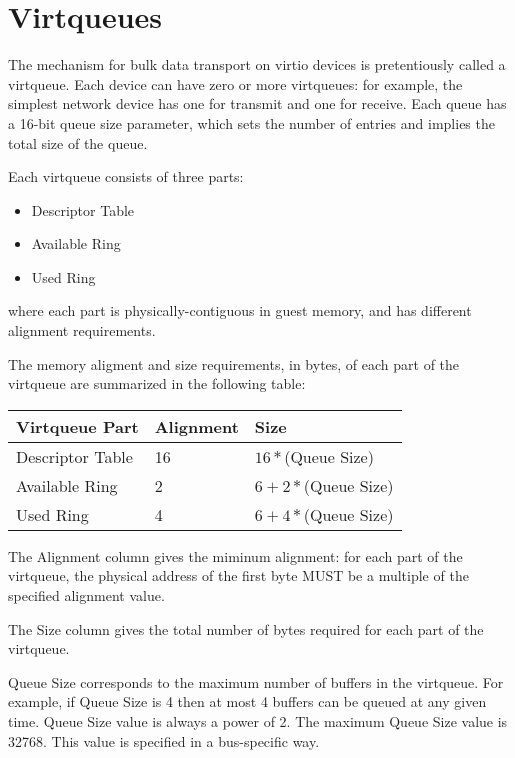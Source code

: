 \section{Virtqueues}\label{sec:Basic Facilities of a Virtio Device / Virtqueues}

The mechanism for bulk data transport on virtio devices is
pretentiously called a virtqueue. Each device can have zero or more
virtqueues: for example, the simplest network device has one for
transmit and one for receive.  Each queue has a 16-bit queue size
parameter, which sets the number of entries and implies the total size
of the queue.

Each virtqueue consists of three parts:

\begin{itemize}
\item Descriptor Table
\item Available Ring
\item Used Ring
\end{itemize}

where each part is physically-contiguous in guest memory,
and has different alignment requirements.

The memory aligment and size requirements, in bytes, of each part of the
virtqueue are summarized in the following table:

\begin{tabular}{|l|l|l|}
\hline
Virtqueue Part    & Alignment & Size \\
\hline \hline
Descriptor Table  & 16        & $16 * $(Queue Size) \\
\hline
Available Ring    & 2         & $6 + 2 * $(Queue Size) \\
 \hline
Used Ring         & 4         & $6 + 4 * $(Queue Size) \\
 \hline
\end{tabular}

The Alignment column gives the miminum alignment: for each part
of the virtqueue, the physical address of the first byte
MUST be a multiple of the specified alignment value.

The Size column gives the total number of bytes required for each
part of the virtqueue.

Queue Size corresponds to the maximum number of buffers in the
virtqueue.  For example, if Queue Size is 4 then at most 4 buffers
can be queued at any given time.  Queue Size value is always a
power of 2.  The maximum Queue Size value is 32768.  This value
is specified in a bus-specific way.

